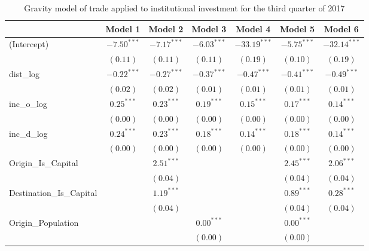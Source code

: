 \begin{table}
	\begin{center}
		\small
		\caption[CGravity Model of Trade for Q3 2017]{Gravity model of trade applied to institutional investment for the third quarter of 2017}
		\begin{tabular}{l c c c c c c }
			\hline
			& Model 1 & Model 2 & Model 3 & Model 4 & Model 5 & Model 6 \\
			\hline
			(Intercept)                  & $-7.50^{***}$ & $-7.17^{***}$ & $-6.03^{***}$ & $-33.19^{***}$ & $-5.75^{***}$ & $-32.14^{***}$ \\
			& $(0.11)$      & $(0.11)$      & $(0.11)$      & $(0.19)$       & $(0.10)$      & $(0.19)$       \\
			dist\_log                    & $-0.22^{***}$ & $-0.27^{***}$ & $-0.37^{***}$ & $-0.47^{***}$  & $-0.41^{***}$ & $-0.49^{***}$  \\
			& $(0.02)$      & $(0.02)$      & $(0.01)$      & $(0.01)$       & $(0.01)$      & $(0.01)$       \\
			inc\_o\_log                  & $0.25^{***}$  & $0.23^{***}$  & $0.19^{***}$  & $0.15^{***}$   & $0.17^{***}$  & $0.14^{***}$   \\
			& $(0.00)$      & $(0.00)$      & $(0.00)$      & $(0.00)$       & $(0.00)$      & $(0.00)$       \\
			inc\_d\_log                  & $0.24^{***}$  & $0.23^{***}$  & $0.18^{***}$  & $0.14^{***}$   & $0.18^{***}$  & $0.14^{***}$   \\
			& $(0.00)$      & $(0.00)$      & $(0.00)$      & $(0.00)$       & $(0.00)$      & $(0.00)$       \\
			Origin\_Is\_Capital          &               & $2.51^{***}$  &               &                & $2.45^{***}$  & $2.06^{***}$   \\
			&               & $(0.04)$      &               &                & $(0.04)$      & $(0.04)$       \\
			Destination\_Is\_Capital     &               & $1.19^{***}$  &               &                & $0.89^{***}$  & $0.28^{***}$   \\
			&               & $(0.04)$      &               &                & $(0.04)$      & $(0.04)$       \\
			Origin\_Population           &               &               & $0.00^{***}$  &                & $0.00^{***}$  &                \\
			&               &               & $(0.00)$      &                & $(0.00)$      &                \\

\end{tabular}
\end{center}
\end{table}
